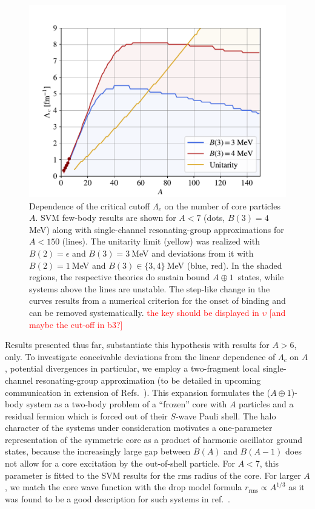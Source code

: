 \documentclass[preprint,12pt]{elsarticle}
\newcommand{\lc}{\ensuremath{\Lambda_c}}
\newcommand{\abb}{\mbox{\ensuremath{A\oplus 1}}}
\newcommand{\red}[1]{\textcolor{red}{#1}}
\begin{document}
\begin{figure}
\centering
\includegraphics[width=\linewidth]{./RGM.pdf} 
\caption{Dependence of the critical cutoff $\lc$ on the number of core particles
$A$. SVM few-body results are shown for $A<7$ (dots, $B(3)=4~$MeV) along with single-channel resonating-group approximations for $A<150$ (lines). The unitarity limit
(yellow) was realized with $B(2)=\epsilon$ and $B(3)=3~$MeV and deviations from it
with $B(2)=1~$MeV and $B(3)\in\lbrace3,4\rbrace~$MeV (blue, red). 
In the shaded regions, the respective theories do sustain bound \abb~states,
while systems above the lines are unstable.
The step-like change in the curves results from a numerical criterion for the onset of binding and
can be removed systematically. 
\red{the key should be displayed in $\upsilon$ [and maybe the cut-off in b3?]}}
\label{fig:RGM}
\end{figure}


Results presented thus far, substantiate this hypothesis with results for $A>6$, only. To investigate conceivable deviations from
the linear dependence of $\lc$ on $A$, potential divergences in particular, we employ a two-fragment
local single-channel resonating-group approximation
(to be detailed in upcoming communication in extension of Refs.~\cite{PhysRev.52.1083,Naidon_2016}). 
This expansion formulates the (\abb)-body system as a two-body problem of a ``frozen'' core with $A$ particles and a residual
fermion which is forced out of their $S$-wave Pauli shell.
The halo character of the systems under consideration motivates a one-parameter representation of the symmetric core as a product of harmonic oscillator ground states, because the increasingly large gap between $B(A)$ and $B(A-1)$ does not allow for a core excitation
by the out-of-shell particle.
For $A<7$, this parameter is fitted to the SVM results for the rms radius of the core.
For larger $A$, we match the core wave function with the drop model formula $r_\text{rms}\propto A^{1/3}$ as 
it was found to be a good description for such systems in ref.~\cite{manybosons}.
\end{document}
